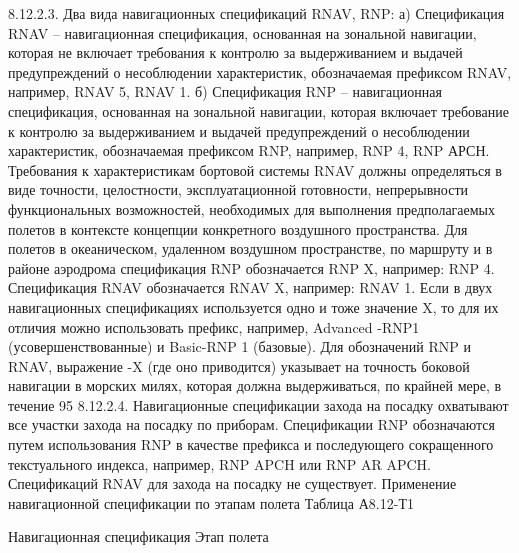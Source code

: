 8.12.2.3.	Два вида навигационных спецификаций RNAV, RNP:
а)	Спецификация RNAV – навигационная спецификация, основанная на зональной навигации, которая не включает требования к контролю за выдерживанием и выдачей предупреждений о несоблюдении характеристик, обозначаемая префиксом RNAV, например, RNAV 5, RNAV 1.
б)	Спецификация RNP – навигационная спецификация, основанная на зональной навигации, которая включает требование к контролю за выдерживанием и выдачей предупреждений о несоблюдении характеристик, обозначаемая префиксом RNP, например, RNP 4, RNP АРСН.
Требования к характеристикам бортовой системы RNAV должны определяться в виде точности, целостности, эксплуатационной готовности, непрерывности функциональных возможностей, необходимых для выполнения предполагаемых полетов в контексте концепции конкретного воздушного пространства.
Для полетов в океаническом, удаленном воздушном пространстве, по маршруту и в районе аэродрома спецификация RNP обозначается RNP X, например: RNP 4.
Спецификация RNAV обозначается RNAV X, например: RNAV 1. Если в двух навигационных спецификациях используется одно и тоже значение X, то для их отличия можно использовать префикс, например, Advanced -RNP1 (усовершенствованные) и Basic-RNP 1 (базовые).
Для обозначений RNP и RNAV, выражение -X (где оно приводится) указывает на точность боковой навигации в морских милях, которая должна выдерживаться, по крайней мере, в течение 95%
8.12.2.4. Навигационные спецификации захода на посадку охватывают все участки захода на посадку по приборам. Спецификации RNP обозначаются путем использования RNP в качестве префикса и последующего сокращенного текстуального индекса, например, RNP APCH или RNP AR APCH. Спецификаций RNAV для захода на посадку не существует.
Применение навигационной спецификации по этапам полета
                                                                                                                                    Таблица А8.12-Т1

Навигационная     спецификация	Этап полета
	
